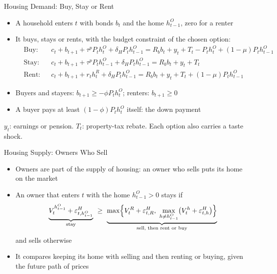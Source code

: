 \documentclass[11pt,aspectratio=169]{beamer}
\newcommand{\notation}[1]{\vfill{\linespread{0.95}\scriptsize\color{sourcegray}#1\par}}
\begin{document}
\begin{frame}{Housing Demand: Buy, Stay or Rent}
\footnotesize
\setlength{\abovedisplayskip}{3pt}\setlength{\belowdisplayskip}{3pt}
\begin{itemize}\setlength\itemsep{5pt}
  \item A household enters $t$ with bonds $b_t$ and the home $h^O_{t-1}$, zero for a renter
  \item It buys, stays or rents, with the budget constraint of the chosen option:
  \[
  \begin{aligned}
  &\text{Buy:}  && c_t+b_{t+1}+\tau^pP_th^O_t+\delta_HP_th^O_{t-1}=R_bb_t+y_t+T_t-P_th^O_t+(1-\mu)P_th^O_{t-1}\\
  &\text{Stay:} && c_t+b_{t+1}+\tau^pP_th^O_{t-1}+\delta_HP_th^O_{t-1}=R_bb_t+y_t+T_t\\
  &\text{Rent:} && c_t+b_{t+1}+r_th^R_t+\delta_HP_th^O_{t-1}=R_bb_t+y_t+T_t+(1-\mu)P_th^O_{t-1}
  \end{aligned}
  \]
  \item Buyers and stayers: $b_{t+1}\ge-\phi P_th^O_t$; renters: $b_{t+1}\ge0$
  \item A buyer pays at least $(1-\phi)P_th^O_t$ itself: the down payment
\end{itemize}
\notation{$y_t$: earnings or pension. $T_t$: property-tax rebate. Each option also carries a taste shock.}
\end{frame}

\begin{frame}{Housing Supply: Owners Who Sell}
\footnotesize
\setlength{\abovedisplayskip}{4pt}\setlength{\belowdisplayskip}{4pt}
\begin{itemize}\setlength\itemsep{6pt}
  \item Owners are part of the supply of housing: an owner who sells puts its home on the market
  \item An owner that enters $t$ with the home $h^O_{t-1}>0$ stays if
  \[
  \underbrace{V^{h^O_{t-1}}_t+\varepsilon^H_{t,h^O_{t-1}}}_{\text{stay}}\ \ge\ \underbrace{\max\Bigl\{V^R_t+\varepsilon^H_{t,R},\ \max_{h\neq h^O_{t-1}}\bigl(V^h_t+\varepsilon^H_{t,h}\bigr)\Bigr\}}_{\text{sell, then rent or buy}}
  \]
  and sells otherwise
  \item It compares keeping its home with selling and then renting or buying, given the future path of prices
\end{itemize}
\end{frame}
\end{document}
